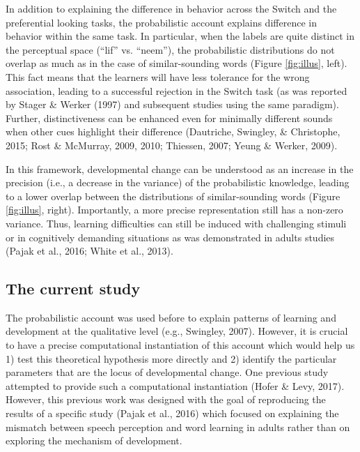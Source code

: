 \documentclass[english,,man]{apa6}
\begin{document}
In addition to explaining the difference in behavior across the Switch and the preferential looking tasks, the probabilistic account explains difference in behavior within the same task. In particular, when the labels are quite distinct in the perceptual space (\enquote{lif} vs. \enquote{neem}), the probabilistic distributions do not overlap as much as in the case of similar-sounding words (Figure \ref{fig:illus}, left). This fact means that the learners will have less tolerance for the wrong association, leading to a successful rejection in the Switch task (as was reported by Stager \& Werker (1997) and subsequent studies using the same paradigm). Further, distinctiveness can be enhanced even for minimally different sounds when other cues highlight their difference (Dautriche, Swingley, \& Christophe, 2015; Rost \& McMurray, 2009, 2010; Thiessen, 2007; Yeung \& Werker, 2009).

In this framework, developmental change can be understood as an increase in the precision (i.e., a decrease in the variance) of the probabilistic knowledge, leading to a lower overlap between the distributions of similar-sounding words (Figure \ref{fig:illus}, right). Importantly, a more precise representation still has a non-zero variance. Thus, learning difficulties can still be induced with challenging stimuli or in cognitively demanding situations as was demonstrated in adults studies (Pajak et al., 2016; White et al., 2013).

\hypertarget{the-current-study}{%
\subsection{The current study}\label{the-current-study}}

The probabilistic account was used before to explain patterns of learning and development at the qualitative level (e.g., Swingley, 2007). However, it is crucial to have a precise computational instantiation of this account which would help us 1) test this theoretical hypothesis more directly and 2) identify the particular parameters that are the locus of developmental change. One previous study attempted to provide such a computational instantiation (Hofer \& Levy, 2017). However, this previous work was designed with the goal of reproducing the results of a specific study (Pajak et al., 2016) which focused on explaining the mismatch between speech perception and word learning in adults rather than on exploring the mechanism of development.
\end{document}
